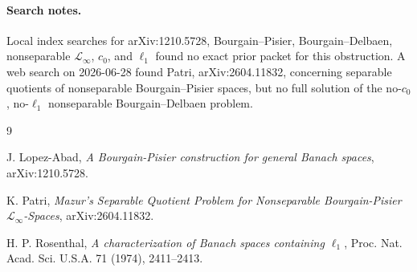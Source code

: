 \documentclass[11pt]{article}
\newcommand{\linf}{\mathcal L_\infty}
\newcommand{\ellone}{\ell_1}
\newcommand{\czero}{c_0}
\begin{document}
\paragraph{Search notes.}
Local index searches for arXiv:1210.5728, Bourgain--Pisier,
Bourgain--Delbaen, nonseparable \(\linf\), \(\czero\), and \(\ellone\) found
no exact prior packet for this obstruction.  A web search on 2026-06-28 found
Patri, arXiv:2604.11832, concerning separable quotients of nonseparable
Bourgain--Pisier spaces, but no full solution of the no-\(\czero\),
no-\(\ellone\) nonseparable Bourgain--Delbaen problem.

\begin{thebibliography}{9}

J. Lopez-Abad,
\emph{A Bourgain-Pisier construction for general Banach spaces},
arXiv:1210.5728.

K. Patri,
\emph{Mazur's Separable Quotient Problem for Nonseparable Bourgain-Pisier
\(\mathcal L_\infty\)-Spaces},
arXiv:2604.11832.

H. P. Rosenthal,
\emph{A characterization of Banach spaces containing \(\ell_1\)},
Proc. Nat. Acad. Sci. U.S.A. 71 (1974), 2411--2413.

\end{thebibliography}
\end{document}

